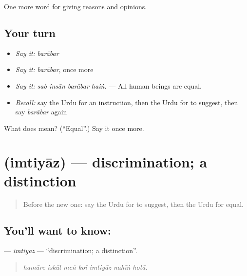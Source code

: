 \begin{grammarlens}[title={What you've built}]
One more word for giving reasons and opinions.
\end{grammarlens}

\subsection*{Your turn}
\begin{itemize}
\raggedright
  \item \emph{Say it:} \emph{barābar}
  \item \emph{Say it:} \emph{barābar}, once more
  \item \emph{Say it:} \emph{sab insān barābar haiṅ.} — All human beings are equal.
  \item \emph{Recall:} say the Urdu for an instruction, then the Urdu for to suggest, then say \emph{barābar} again
\end{itemize}

\begin{tcolorbox}[breakable,colback=teal!4,colframe=teal!35!black,title={Before you move on}]
What does  mean? (\textquotedblleft{}Equal\textquotedblright{}.) Say it once more.
\end{tcolorbox}
\section[\texorpdfstring{\ur{امتیاز} (imtiyāz)}{امتیاز (imtiyāz)}]{ (imtiyāz) — discrimination; a distinction}

\label{lesson:UR-C344-imtiyaz}



\begin{quote}
Before the new one: say the Urdu for to suggest, then the Urdu for equal.
\end{quote}

\subsection*{You'll want to know: }
\textbf{} — \emph{imtiyāz} — \textquotedblleft{}discrimination; a distinction\textquotedblright{}.

\begin{quote}
      
\end{quote}

\begin{quote}
\emph{hamāre iskūl meṅ koī imtiyāz nahīṅ hotā.}
\end{quote}

